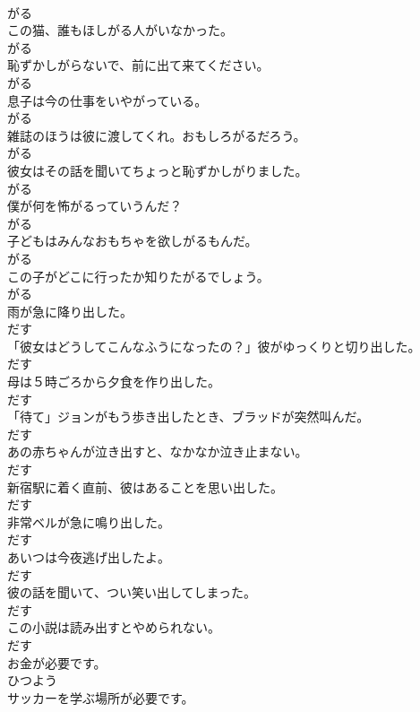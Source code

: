 \documentclass[8pt]{extreport}
\begin{document}
\begin{CJK}{UTF8}{min}
\\	がる
\\	この猫、誰もほしがる人がいなかった。	
\\	がる
\\	恥ずかしがらないで、前に出て来てください。	
\\	がる
\\	息子は今の仕事をいやがっている。	
\\	がる
\\	雑誌のほうは彼に渡してくれ。おもしろがるだろう。	
\\	がる
\\	彼女はその話を聞いてちょっと恥ずかしがりました。	
\\	がる
\\	僕が何を怖がるっていうんだ？	
\\	がる
\\	子どもはみんなおもちゃを欲しがるもんだ。	
\\	がる
\\	この子がどこに行ったか知りたがるでしょう。	
\\	がる
\\	雨が急に降り出した。	
\\	だす
\\	「彼女はどうしてこんなふうになったの？」彼がゆっくりと切り出した。	
\\	だす
\\	母は５時ごろから夕食を作り出した。	
\\	だす
\\	「待て」ジョンがもう歩き出したとき、ブラッドが突然叫んだ。	
\\	だす
\\	あの赤ちゃんが泣き出すと、なかなか泣き止まない。	
\\	だす
\\	新宿駅に着く直前、彼はあることを思い出した。	
\\	だす
\\	非常ベルが急に鳴り出した。	
\\	だす
\\	あいつは今夜逃げ出したよ。	
\\	だす
\\	彼の話を聞いて、つい笑い出してしまった。	
\\	だす
\\	この小説は読み出すとやめられない。	
\\	だす
\\	お金が必要です。	
\\	ひつよう
\\	サッカーを学ぶ場所が必要です。	

\end{CJK}
\end{document}
